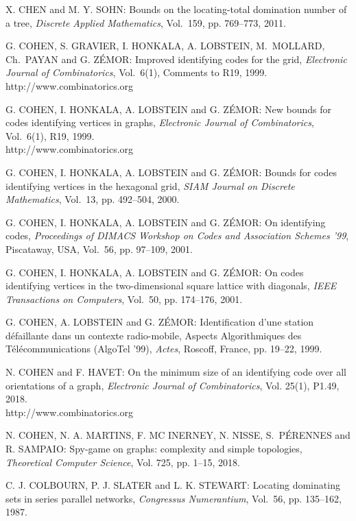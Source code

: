 \begin{thebibliography}{999}
X. CHEN and M. Y. SOHN: Bounds on the locating-total domination number of a tree, {\it Discrete Applied Mathematics}, Vol.~159, pp. 769--773, 2011.

G. COHEN, S. GRAVIER, I. HONKALA, A. LOBSTEIN, M.~MOLLARD, Ch.~PAYAN and G. Z\'EMOR: Improved identifying codes for the grid, {\it Electronic Journal of Combinatorics}, Vol.~6(1), Comments to R19, 1999.\\
http://www.combinatorics.org

%
G. COHEN, I. HONKALA, A. LOBSTEIN and G. Z\'EMOR: New bounds for codes identifying vertices in graphs, {\it Electronic Journal of Combinatorics}, Vol.~6(1), R19, 1999.\\
http://www.combinatorics.org

G. COHEN, I. HONKALA, A. LOBSTEIN and G. Z\'EMOR: Bounds for codes identifying vertices in the hexagonal grid, {\it SIAM Journal on Discrete Mathematics}, Vol.~13, pp. 492--504, 2000.

G. COHEN, I. HONKALA, A. LOBSTEIN and G. Z\'EMOR: On identifying codes, {\it Proceedings of DIMACS Workshop on Codes and Association Schemes '99}, Piscataway, USA, Vol.~56, pp. 97--109, 2001.

G. COHEN, I. HONKALA, A. LOBSTEIN and G. Z\'EMOR: On codes identifying vertices in the two-dimensional square lattice with diagonals, {\it IEEE Transactions on Computers}, Vol.~50, pp. 174--176, 2001.

G. COHEN, A. LOBSTEIN and G. Z\'EMOR: Identification d'une station d\'efaillante dans un contexte radio-mobile, Aspects Algorithmiques des T\'el\'ecommunications (AlgoTel '99), {\it Actes}, Roscoff, France, pp. 19--22, 1999.

N. COHEN and F. HAVET: On the minimum size of an identifying code over all orientations of a graph, {\it Electronic Journal of Combinatorics}, Vol. 25(1), P1.49, 2018.\\
http://www.combinatorics.org

N. COHEN, N. A. MARTINS, F. MC INERNEY, N. NISSE, S.~P\'E\-RENNES and R. SAMPAIO: Spy-game on graphs: complexity and simple topologies, {\it Theoretical Computer Science}, Vol. 725, pp. 1--15, 2018. 

C. J. COLBOURN, P. J. SLATER and L. K. STEWART: Locating dominating sets in series parallel networks, {\it Congressus Numerantium}, Vol.~56, pp. 135--162, 1987.


\end{thebibliography}
